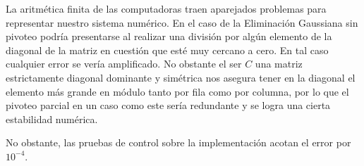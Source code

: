 La aritmética finita de las computadoras traen aparejados problemas para representar nuestro sistema numérico. En el caso de la Eliminación Gaussiana sin pivoteo podría presentarse al realizar una división por algún elemento de la diagonal de la matriz en cuestión que esté muy cercano a cero. En tal caso cualquier error se vería amplificado. No obstante el ser $C$ una matriz estrictamente diagonal dominante y simétrica nos asegura tener en la diagonal el elemento más grande en módulo tanto por fila como por columna, por lo que el pivoteo parcial en un caso como este sería redundante y se logra una cierta estabilidad numérica.

No obstante, las pruebas de control sobre la implementación acotan el error por $10^{-4}$.
